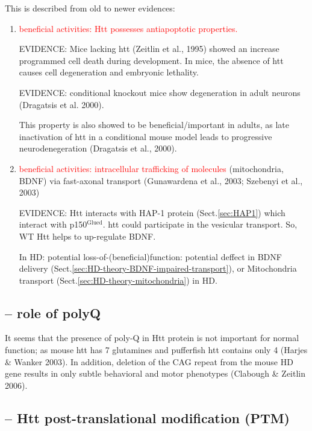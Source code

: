 This is described from old to newer evidences:
\begin{enumerate}
  \item \textcolor{red}{beneficial activities:  Htt possesses antiapoptotic
  properties.}

EVIDENCE: Mice lacking htt (Zeitlin et al., 1995) showed an increase programmed
cell death during development. In mice, the absence of htt causes cell
degeneration and embryonic  lethality.

EVIDENCE: conditional knockout mice show degeneration in adult neurons
(Dragatsis et al. 2000). 

This property is also showed to be beneficial/important in adults, as late
inactivation of htt in a conditional mouse model leads to progressive
neurodenegeration (Dragatsis et al., 2000).
  
  \item \textcolor{red}{beneficial activities: intracellular trafficking of
  molecules} (mitochondria, BDNF) via fast-axonal transport (Gunawardena et al., 2003; Szebenyi et al., 2003)

EVIDENCE: Htt interacts with HAP-1 protein (Sect.\ref{sec:HAP1}) which interact
with p150$^\text{Glued}$. htt could participate in the vesicular transport. So,
WT Htt helps to up-regulate BDNF. 

In HD: potential loss-of-(beneficial)function:
potential deffect in BDNF delivery
(Sect.\ref{sec:HD-theory-BDNF-impaired-transport}), or Mitochondria transport
(Sect.\ref{sec:HD-theory-mitochondria}) in HD.

\end{enumerate}

\subsection{-- role of polyQ}

It seems that the presence of poly-Q in Htt protein is not important for normal
function; as mouse htt has 7 glutamines and pufferfish htt contains only 4
(Harjes \& Wanker 2003). In addition, deletion of the CAG repeat from the mouse
HD gene results in only subtle behavioral and motor phenotypes (Clabough \&
Zeitlin 2006).




\subsection{-- Htt post-translational modification (PTM)}
\label{sec:Htt-PTM}
\label{sec:Htt-Post-translational-modification}

